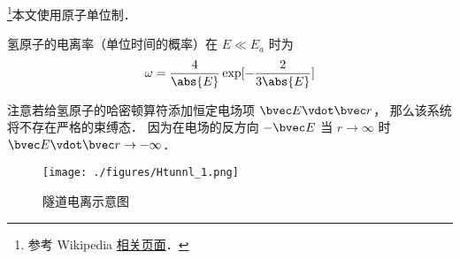 
\footnote{参考 Wikipedia \href{https://en.wikipedia.org/wiki/Tunnel_ionization}{相关页面}．}本文使用原子单位制．

氢原子的电离率（单位时间的概率）在 $E \ll E_a$ 时为
\begin{equation}
\omega = \frac{4}{\abs{E}} \exp[-\frac{2}{3\abs{E}}]
\end{equation}


注意若给氢原子的哈密顿算符添加恒定电场项 $\bvec E \vdot \bvec r$， 那么该系统将不存在严格的束缚态． 因为在电场的反方向 $-\bvec E$ 当 $r\to\infty$ 时 $\bvec E \vdot \bvec r \to -\infty$．

\begin{figure}[ht]
\centering
\texttt{[image: ./figures/Htunnl\_1.png]}
\caption{隧道电离示意图} \label{Htunnl_fig1}
\end{figure}

